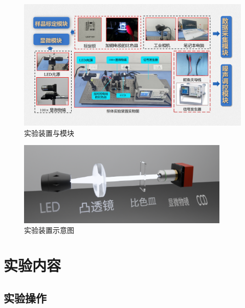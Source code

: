 \documentclass[a4paper]{report} %
\begin{document}
\begin{figure}[H]
    \centering
    \includegraphics[width=1.0\textwidth]{实验装置模块.png}
    \caption{实验装置与模块}
    \label{fig:allsetup}
\end{figure}
\begin{figure}[H]
    \centering
    \includegraphics[width=0.9\textwidth]{实验示意图.png}
    \caption{实验装置示意图}
    \label{fig:sets}
\end{figure} 
\chapter{实验内容}

\section{实验操作}
\end{document}
